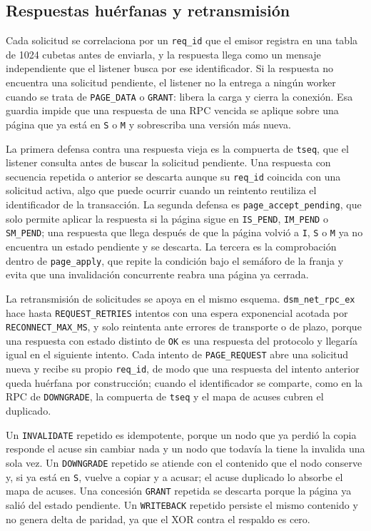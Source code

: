 \subsection{Respuestas huérfanas y retransmisión}\label{sec:msi-huerfanas}

Cada solicitud se correlaciona por un \texttt{req\_id} que el emisor registra en una tabla de 1024 cubetas antes de enviarla, y la respuesta llega como un mensaje independiente que el listener busca por ese identificador. Si la respuesta no encuentra una solicitud pendiente, el listener no la entrega a ningún worker cuando se trata de \texttt{PAGE\_DATA} o \texttt{GRANT}: libera la carga y cierra la conexión. Esa guardia impide que una respuesta de una RPC vencida se aplique sobre una página que ya está en \texttt{S} o \texttt{M} y sobrescriba una versión más nueva.

La primera defensa contra una respuesta vieja es la compuerta de \texttt{tseq}, que el listener consulta antes de buscar la solicitud pendiente. Una respuesta con secuencia repetida o anterior se descarta aunque su \texttt{req\_id} coincida con una solicitud activa, algo que puede ocurrir cuando un reintento reutiliza el identificador de la transacción. La segunda defensa es \texttt{page\_accept\_pending}, que solo permite aplicar la respuesta si la página sigue en \texttt{IS\_PEND}, \texttt{IM\_PEND} o \texttt{SM\_PEND}; una respuesta que llega después de que la página volvió a \texttt{I}, \texttt{S} o \texttt{M} ya no encuentra un estado pendiente y se descarta. La tercera es la comprobación dentro de \texttt{page\_apply}, que repite la condición bajo el semáforo de la franja y evita que una invalidación concurrente reabra una página ya cerrada.

La retransmisión de solicitudes se apoya en el mismo esquema. \texttt{dsm\_net\_rpc\_ex} hace hasta \texttt{REQUEST\_RETRIES} intentos con una espera exponencial acotada por \texttt{RECONNECT\_MAX\_MS}, y solo reintenta ante errores de transporte o de plazo, porque una respuesta con estado distinto de \texttt{OK} es una respuesta del protocolo y llegaría igual en el siguiente intento. Cada intento de \texttt{PAGE\_REQUEST} abre una solicitud nueva y recibe su propio \texttt{req\_id}, de modo que una respuesta del intento anterior queda huérfana por construcción; cuando el identificador se comparte, como en la RPC de \texttt{DOWNGRADE}, la compuerta de \texttt{tseq} y el mapa de acuses cubren el duplicado.

Un \texttt{INVALIDATE} repetido es idempotente, porque un nodo que ya perdió la copia responde el acuse sin cambiar nada y un nodo que todavía la tiene la invalida una sola vez. Un \texttt{DOWNGRADE} repetido se atiende con el contenido que el nodo conserve y, si ya está en \texttt{S}, vuelve a copiar y a acusar; el acuse duplicado lo absorbe el mapa de acuses. Una concesión \texttt{GRANT} repetida se descarta porque la página ya salió del estado pendiente. Un \texttt{WRITEBACK} repetido persiste el mismo contenido y no genera delta de paridad, ya que el XOR contra el respaldo es cero.

